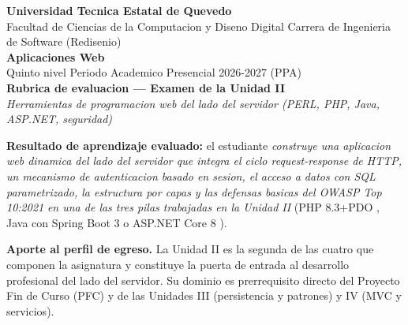 \documentclass[10pt,a4paper]{article}
\begin{document}
\color{textogris}

\begin{tcolorbox}[colback=verdeclaro,colframe=uteqverde,boxrule=1pt,arc=2pt,left=8pt,right=8pt,top=6pt,bottom=6pt]
    \begin{center}
        {\normalsize\bfseries\color{uteqverde} Universidad Tecnica Estatal de Quevedo}\\[1pt]
        {\footnotesize Facultad de Ciencias de la Computacion y Diseno Digital \quad\textbar\quad Carrera de Ingenieria de Software (Redisenio)}\\[3pt]
        {\large\bfseries\color{uteqverde} Aplicaciones Web}\\[1pt]
        {\footnotesize Quinto nivel \quad\textbar\quad Periodo Academico Presencial 2026-2027 (PPA)}\\[3pt]
        {\normalsize\bfseries Rubrica de evaluacion --- Examen de la Unidad II}\\
        {\footnotesize\itshape Herramientas de programacion web del lado del servidor (PERL, PHP, Java, ASP.NET, seguridad)}
    \end{center}
\end{tcolorbox}

\vspace{2pt}

\noindent\textbf{Resultado de aprendizaje evaluado:} el estudiante \emph{construye una aplicacion web dinamica del lado del servidor que integra el ciclo request-response de HTTP, un mecanismo de autenticacion basado en sesion, el acceso a datos con SQL parametrizado, la estructura por capas y las defensas basicas del OWASP Top 10:2021} \cite{owasp2021top10} \emph{en una de las tres pilas trabajadas en la Unidad II} (PHP 8.3+PDO \cite{nixon2021learning}, Java con Spring Boot 3 \cite{walls2022spring} o ASP.NET Core 8 \cite{lock2021asp}).

\vspace{4pt}

\noindent\textbf{Aporte al perfil de egreso.} La Unidad II es la segunda de las cuatro que componen la asignatura y constituye la puerta de entrada al desarrollo profesional del lado del servidor. Su dominio es prerrequisito directo del Proyecto Fin de Curso (PFC) y de las Unidades III (persistencia y patrones) y IV (MVC y servicios).
\end{document}
